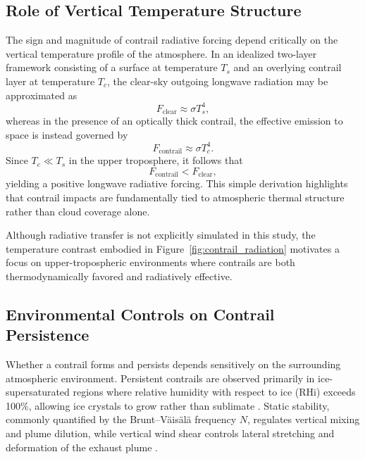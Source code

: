 \documentclass[11pt]{article}
\begin{document}
\subsection{Role of Vertical Temperature Structure}

The sign and magnitude of contrail radiative forcing depend critically on the vertical
temperature profile of the atmosphere. In an idealized two-layer framework consisting of
a surface at temperature $T_s$ and an overlying contrail layer at temperature $T_c$, the
clear-sky outgoing longwave radiation may be approximated as
\begin{equation}
    F_{\text{clear}} \approx \sigma T_s^4,
\end{equation}
whereas in the presence of an optically thick contrail, the effective emission to space
is instead governed by
\begin{equation}
    F_{\text{contrail}} \approx \sigma T_c^4.
\end{equation}
Since $T_c \ll T_s$ in the upper troposphere, it follows that
\begin{equation}
    F_{\text{contrail}} < F_{\text{clear}},
\end{equation}
yielding a positive longwave radiative forcing. This simple derivation highlights that
contrail impacts are fundamentally tied to atmospheric thermal structure rather than
cloud coverage alone.

Although radiative transfer is not explicitly simulated in this study, the temperature
contrast embodied in Figure~\ref{fig:contrail_radiation} motivates a focus on
upper-tropospheric environments where contrails are both thermodynamically favored and
radiatively effective.

\subsection{Environmental Controls on Contrail Persistence}

Whether a contrail forms and persists depends sensitively on the surrounding atmospheric
environment. Persistent contrails are observed primarily in ice-supersaturated regions
where relative humidity with respect to ice (RHi) exceeds 100\%, allowing ice crystals to
grow rather than sublimate \cite{Schumann1996,Schumann2017Monograph,GierensSpichtinger2012}.
Static stability, commonly quantified by the Brunt--V\"ais\"al\"a frequency $N$, regulates vertical mixing
and plume dilution, while vertical wind shear controls lateral stretching and deformation of the exhaust plume
\cite{Schumann2017Monograph,Turner1973}.
\end{document}
